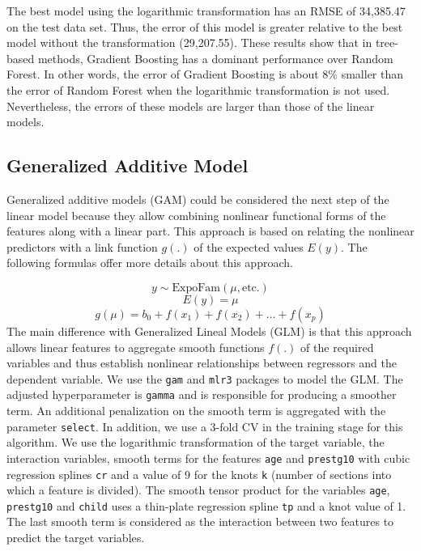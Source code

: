 \documentclass[11pt,a4paper]{article}
\begin{document}
The best model using the logarithmic transformation has an RMSE of
34,385.47 on the test data set. Thus, the error of this model is greater
relative to the best model without the transformation (29,207.55). These
results show that in tree-based methods, Gradient Boosting has a
dominant performance over Random Forest. In other words, the error of
Gradient Boosting is about 8\% smaller than the error of Random Forest
when the logarithmic transformation is not used. Nevertheless, the
errors of these models are larger than those of the linear models.

\hypertarget{generalized-additive-model}{%
\subsection{Generalized Additive
Model}\label{generalized-additive-model}}

Generalized additive models (GAM) could be considered the next step of
the linear model because they allow combining nonlinear functional forms
of the features along with a linear part. This approach is based on
relating the nonlinear predictors with a link function \(g(.)\) of the
expected values \(E(y)\). The following formulas offer more details
about this approach.

\[
y \sim \text{ExpoFam}(\mu, \text{etc.})
\] \[
E(y) = \mu
\] \[
g(\mu) = b_0 + f(x_1) + f(x_2) + \dots + f(x_p)
\] The main difference with Generalized Lineal Models (GLM) is that this
approach allows linear features to aggregate smooth functions \(f(.)\)
of the required variables and thus establish nonlinear relationships
between regressors and the dependent variable. We use the \texttt{gam}
and \texttt{mlr3} packages to model the GLM. The adjusted hyperparameter
is \texttt{gamma} and is responsible for producing a smoother term. An
additional penalization on the smooth term is aggregated with the
parameter \texttt{select}. In addition, we use a 3-fold CV in the
training stage for this algorithm. We use the logarithmic transformation
of the target variable, the interaction variables, smooth terms for the
features \texttt{age} and \texttt{prestg10} with cubic regression
splines \texttt{cr} and a value of 9 for the knots \texttt{k} (number of
sections into which a feature is divided). The smooth tensor product for
the variables \texttt{age}, \texttt{prestg10} and \texttt{child} uses a
thin-plate regression spline \texttt{tp} and a knot value of 1. The last
smooth term is considered as the interaction between two features to
predict the target variables.
\end{document}
